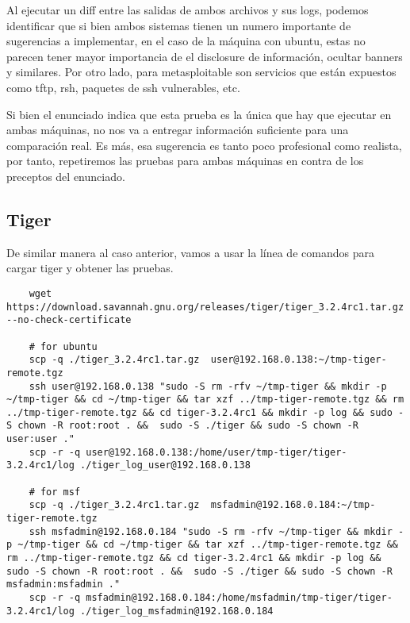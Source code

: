 \documentclass[11pt]{utalcaDoc}
\begin{document}

Al ejecutar un diff entre las salidas de ambos archivos y sus logs, podemos identificar que si bien ambos sistemas tienen un numero importante de sugerencias a implementar, en el caso de la máquina con ubuntu, estas no parecen tener mayor importancia de el disclosure de información, ocultar banners y similares. Por otro lado, para metasploitable son servicios que están expuestos como tftp, rsh, paquetes de ssh vulnerables, etc.


Si bien el enunciado indica que esta prueba es la única que hay que ejecutar en ambas máquinas, no nos va a entregar información suficiente para una comparación real. Es más, esa sugerencia es tanto poco profesional como realista, por tanto, repetiremos las pruebas para ambas máquinas en contra de los preceptos del enunciado.


\subsection{Tiger}

De similar manera al caso anterior, vamos a usar la línea de comandos para cargar tiger y obtener las pruebas.

\begin{verbatim}
	wget https://download.savannah.gnu.org/releases/tiger/tiger_3.2.4rc1.tar.gz --no-check-certificate

	# for ubuntu
	scp -q ./tiger_3.2.4rc1.tar.gz  user@192.168.0.138:~/tmp-tiger-remote.tgz 
	ssh user@192.168.0.138 "sudo -S rm -rfv ~/tmp-tiger && mkdir -p ~/tmp-tiger && cd ~/tmp-tiger && tar xzf ../tmp-tiger-remote.tgz && rm ../tmp-tiger-remote.tgz && cd tiger-3.2.4rc1 && mkdir -p log && sudo -S chown -R root:root . &&  sudo -S ./tiger && sudo -S chown -R user:user ."
	scp -r -q user@192.168.0.138:/home/user/tmp-tiger/tiger-3.2.4rc1/log ./tiger_log_user@192.168.0.138

	# for msf
	scp -q ./tiger_3.2.4rc1.tar.gz  msfadmin@192.168.0.184:~/tmp-tiger-remote.tgz 
	ssh msfadmin@192.168.0.184 "sudo -S rm -rfv ~/tmp-tiger && mkdir -p ~/tmp-tiger && cd ~/tmp-tiger && tar xzf ../tmp-tiger-remote.tgz && rm ../tmp-tiger-remote.tgz && cd tiger-3.2.4rc1 && mkdir -p log && sudo -S chown -R root:root . &&  sudo -S ./tiger && sudo -S chown -R msfadmin:msfadmin ."
	scp -r -q msfadmin@192.168.0.184:/home/msfadmin/tmp-tiger/tiger-3.2.4rc1/log ./tiger_log_msfadmin@192.168.0.184
\end{verbatim}
\end{document}
